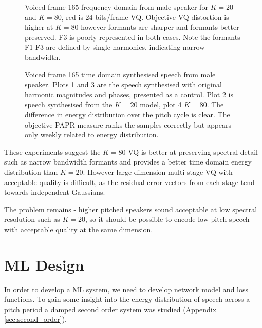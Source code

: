 \documentclass{article}
\begin{document}
\begin{figure}
\caption{Voiced frame 165 frequency domain from male speaker for $K=20$ and $K=80$, red is 24 bits/frame VQ. Objective VQ distortion is higher at $K=80$ however formants are sharper and formants better preserved.  F3 is poorly represented in both cases.  Note the formants F1-F3 are defined by single harmonics, indicating narrow bandwidth.}
\label{fig:big_dog_f165_freq}
\begin{center}


\end{center}
\end{figure}

\begin{figure}
\caption{Voiced frame 165 time domain synthesised speech from male speaker.  Plots 1 and 3 are the speech synthesised with original harmonic magnitudes and phases, presented as a control.  Plot 2 is speech synthesised from the $K=20$ model, plot 4 $K=80$. The difference in energy distribution over the pitch cycle is clear.  The objective PAPR measure ranks the samples correctly but appears only weekly related to energy distribution.}
\label{fig:big_dog_f165_time}
\begin{center}


\end{center}
\end{figure}

These experiments suggest the $K=80$ VQ is better at preserving spectral detail such as narrow bandwidth formants and provides a better time domain energy distribution than $K=20$.  However large dimension multi-stage VQ with acceptable quality is difficult, as the residual error vectors from each stage tend towards independent Gaussians.

The problem remains - higher pitched speakers sound acceptable at low spectral resolution such as $K=20$, so it should be possible to encode low pitch speech with acceptable quality at the same dimension.

\section{ML Design}

In order to develop a ML system, we need to develop network model and loss functions. To gain some insight into the energy distribution of speech across a pitch period a damped second order system was studied (Appendix \ref{sec:second_order}).
\end{document}
